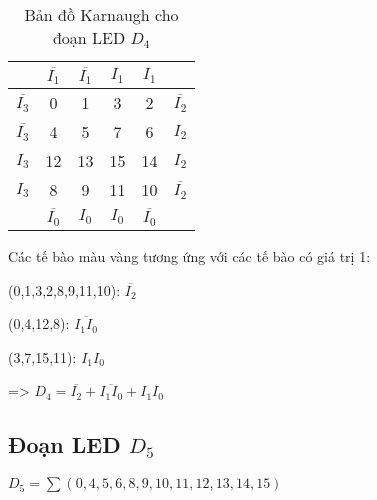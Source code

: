 \begin{table}[H]
	\centering
	\begin{tabular}{|c|c|c|c|c|c|}
		\hline
		                   & \(\overline{I_1}\)   & \(\overline{I_1}\)  & \(I_1\)              & \(I_1\)              &                    \\
		\hline
		\(\overline{I_3}\) & \cellcolor{yellow}0  & \cellcolor{yellow}1 & \cellcolor{yellow}3  & \cellcolor{yellow}2  & \(\overline{I_2}\) \\
		\hline
		\(\overline{I_3}\) & \cellcolor{yellow}4  & 5                   & \cellcolor{yellow}7  & 6                    & \(I_2\)            \\
		\hline
		\(I_3\)            & \cellcolor{yellow}12 & 13                  & \cellcolor{yellow}15 & 14                   & \(I_2\)            \\
		\hline
		\(I_3\)            & \cellcolor{yellow}8  & \cellcolor{yellow}9 & \cellcolor{yellow}11 & \cellcolor{yellow}10 & \(\overline{I_2}\) \\
		\hline
		                   & \(\overline{I_0}\)   & \(I_0\)             & \(I_0\)              & \(\overline{I_0}\)   &                    \\
		\hline
	\end{tabular}
	\caption*{Bản đồ Karnaugh cho đoạn LED \(D_4\)}
\end{table}

Các tế bào màu vàng tương ứng với các tế bào có giá trị 1:

(0,1,3,2,8,9,11,10): \(\overline{I_2}\)

(0,4,12,8): \(\overline{I_1 I_0}\)

(3,7,15,11): \(I_1 I_0\)

=> \(D_4 = \overline{I_2} + \overline{I_1 I_0} + I_1 I_0\)

\subsection{Đoạn LED \texorpdfstring{$D_5$}{D5}}

\(D_5 = \sum(0,4,5,6,8,9,10,11,12,13,14,15)\)

